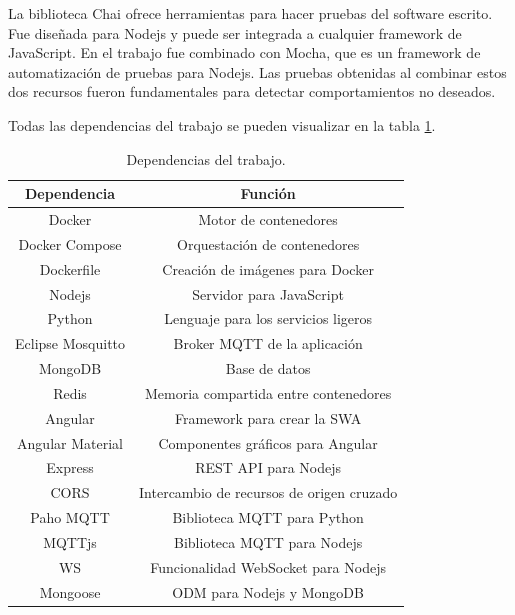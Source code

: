 La biblioteca Chai ofrece herramientas para hacer pruebas del software escrito.
Fue diseñada para Nodejs y puede ser integrada a cualquier framework de JavaScript.
En el trabajo fue combinado con Mocha, que es un framework de automatización de pruebas para Nodejs.
Las pruebas obtenidas al combinar estos dos recursos fueron fundamentales para detectar comportamientos no deseados.

Todas las dependencias del trabajo se pueden visualizar en la tabla \ref{tab:dependencias}.

\begin{table}[h]
	\centering
	\caption{\label{tab:dependencias}Dependencias del trabajo.}
	\begin{tabular}{c c}
		\toprule
		\textbf{Dependencia}      & \textbf{Función}                          \\
		\midrule
		Docker             & Motor de contenedores                     \\
		Docker Compose     & Orquestación de contenedores              \\
		Dockerfile         & Creación de imágenes para Docker          \\
		Nodejs             & Servidor para JavaScript                  \\
		Python             & Lenguaje para los servicios ligeros       \\
		Eclipse Mosquitto  & Broker MQTT de la aplicación              \\
		MongoDB            & Base de datos                             \\
		Redis              & Memoria compartida entre contenedores     \\
		Angular            & Framework para crear la SWA               \\
		Angular Material   & Componentes gráficos para Angular         \\
		Express            & REST API para Nodejs                      \\
		CORS               & Intercambio de recursos de origen cruzado \\
		Paho MQTT          & Biblioteca MQTT para Python               \\
		MQTTjs             & Biblioteca MQTT para Nodejs               \\
		WS                 & Funcionalidad WebSocket para Nodejs       \\
		Mongoose           & ODM para Nodejs y MongoDB                 \\

\end{tabular}
\end{table}
